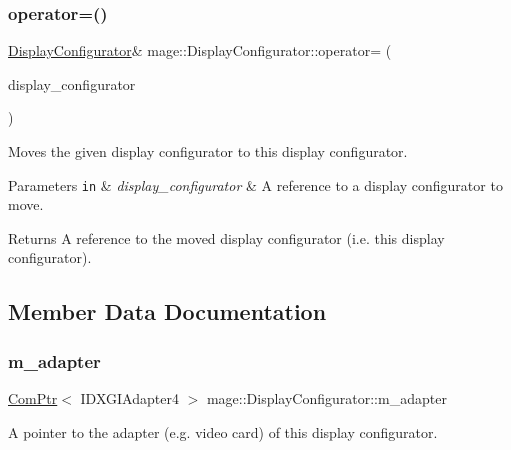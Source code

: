 \subsubsection{\texorpdfstring{operator=()}{operator=()}\hspace{0.1cm}{\footnotesize\ttfamily [2/2]}}
{\footnotesize\ttfamily \hyperlink{classmage_1_1_display_configurator}{Display\+Configurator}\& mage\+::\+Display\+Configurator\+::operator= (\begin{DoxyParamCaption}\item[{\hyperlink{classmage_1_1_display_configurator}{Display\+Configurator} \&\&}]{display\+\_\+configurator }\end{DoxyParamCaption})\hspace{0.3cm}{\ttfamily [delete]}}

Moves the given display configurator to this display configurator.


\begin{DoxyParams}[1]{Parameters}
\mbox{\tt in}  & {\em display\+\_\+configurator} & A reference to a display configurator to move. \\
\hline
\end{DoxyParams}
\begin{DoxyReturn}{Returns}
A reference to the moved display configurator (i.\+e. this display configurator). 
\end{DoxyReturn}


\subsection{Member Data Documentation}
\hypertarget{classmage_1_1_display_configurator_a2839c57559a284d6cfbedaaa1a8bcd9f}{}\label{classmage_1_1_display_configurator_a2839c57559a284d6cfbedaaa1a8bcd9f} 
\subsubsection{\texorpdfstring{m\+\_\+adapter}{m\_adapter}}
{\footnotesize\ttfamily \hyperlink{namespacemage_ae74f374780900893caa5555d1031fd79}{Com\+Ptr}$<$ I\+D\+X\+G\+I\+Adapter4 $>$ mage\+::\+Display\+Configurator\+::m\+\_\+adapter\hspace{0.3cm}{\ttfamily [private]}}

A pointer to the adapter (e.\+g. video card) of this display configurator. \hypertarget{classmage_1_1_display_configurator_a5bccdf0eb57db38cf4e933ecf127488d}{}\label{classmage_1_1_display_configurator_a5bccdf0eb57db38cf4e933ecf127488d} 

